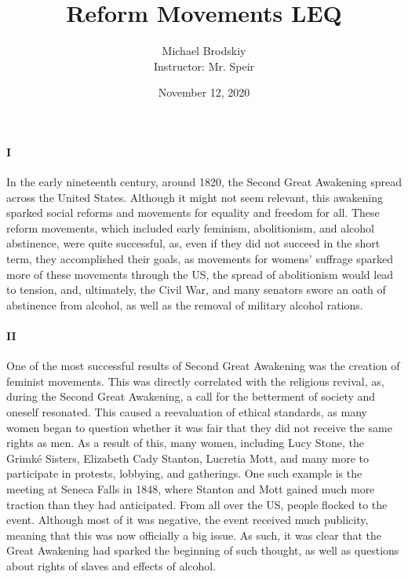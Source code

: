 \documentclass[12pt]{article}
\title{Reform Movements LEQ}
\date{November 12, 2020}
\author{Michael Brodskiy\\ \small Instructor: Mr. Speir}
\begin{document}
    \maketitle

    \paragraph{I} In the early nineteenth century, around 1820, the Second Great Awakening spread across the United States. Although it might not seem relevant, this awakening sparked social reforms and movements for equality and freedom for all. These reform movements, which included early feminism, abolitionism, and alcohol abstinence, were quite successful, as, even if they did not succeed in the short term, they accomplished their goals, as movements for womens' suffrage sparked more of these movements through the US, the spread of abolitionism would lead to tension, and, ultimately, the Civil War, and many senators swore an oath of abstinence from alcohol, as well as the removal of military alcohol rations. 
 
    \paragraph{II} One of the most successful results of Second Great Awakening was the creation of feminist movements. This was directly correlated with the religious revival, as, during the Second Great Awakening, a call for the betterment of society and oneself resonated. This caused a reevaluation of ethical standards, as many women began to question whether it was fair that they did not receive the same rights as men. As a result of this, many women, including Lucy Stone, the Grimk\'e Sisters, Elizabeth Cady Stanton, Lucretia Mott, and many more to participate in protests, lobbying, and gatherings. One such example is the meeting at Seneca Falls in 1848, where Stanton and Mott gained much more traction than they had anticipated. From all over the US, people flocked to the event. Although most of it was negative, the event received much publicity, meaning that this was now officially a big issue. As such, it was clear that the Great Awakening had sparked the beginning of such thought, as well as questions about rights of slaves and effects of alcohol.
\end{document}
